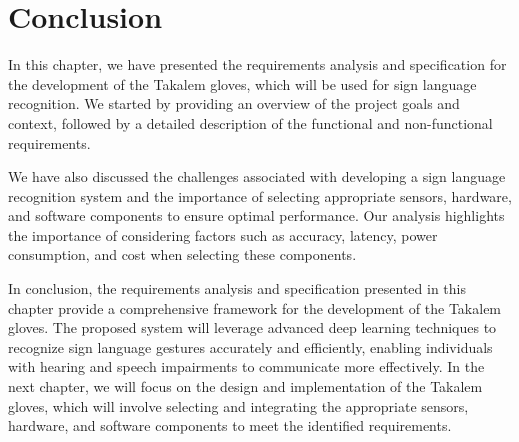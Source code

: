 \section{Conclusion}
In this chapter, we have presented the requirements analysis and specification for the development of the Takalem gloves, which will be used for sign language recognition. We started by providing an overview of the project goals and context, followed by a detailed description of the functional and non-functional requirements.

We have also discussed the challenges associated with developing a sign language recognition system and the importance of selecting appropriate sensors, hardware, and software components to ensure optimal performance. Our analysis highlights the importance of considering factors such as accuracy, latency, power consumption, and cost when selecting these components.

In conclusion, the requirements analysis and specification presented in this chapter provide a comprehensive framework for the development of the Takalem gloves. The proposed system will leverage advanced deep learning techniques to recognize sign language gestures accurately and efficiently, enabling individuals with hearing and speech impairments to communicate more effectively. In the next chapter, we will focus on the design and implementation of the Takalem gloves, which will involve selecting and integrating the appropriate sensors, hardware, and software components to meet the identified requirements.